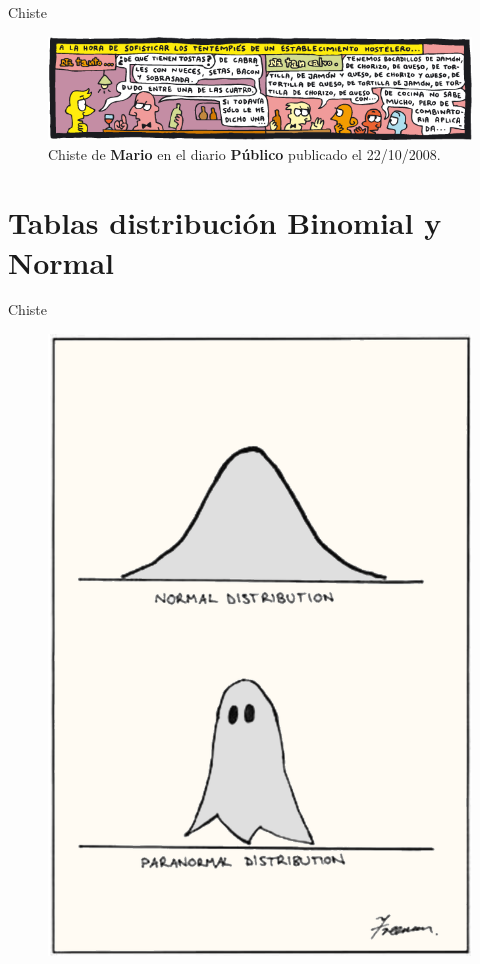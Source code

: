 \begin{myexampleblock}{Chiste}
	\begin{figure}[H]
	\centering
	\includegraphics[width=1\textwidth]{imagenes/apendices/app11.png}
	\caption*{\scriptsize{Chiste de \textbf{Mario} en el diario \textbf{Público} publicado el 22/10/2008}\normalsize{.}}
	\end{figure}
\end{myexampleblock}


\chapter{Tablas distribución Binomial y Normal}

\begin{myexampleblock}{Chiste}
	\begin{figure}[H]
	\centering
	\includegraphics[width=.65\textwidth]{imagenes/apendices/app15.png}
	\end{figure}
\end{myexampleblock}


